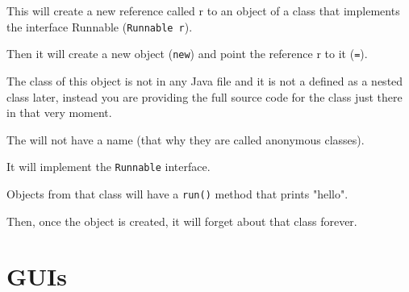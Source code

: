 \documentclass[a4paper, 9pt]{extarticle}
\begin{document}
This will create a new reference called r to an object of a class that
implements the interface Runnable (\verb+Runnable r+).

Then it will create a new object (\verb+new+) and point the reference r to it
(\verb+=+).

The class of this object is not in any Java file and it is not a defined as a
nested class later, instead you are providing the full source code for the
class just there in that very moment.

The will not have a name (that why they are called anonymous classes).

It will implement the \verb+Runnable+ interface.

Objects from that class will have a \verb+run()+ method that prints "hello".

Then, once the object is created, it will forget about that class forever.












\section{GUIs}
\end{document}
